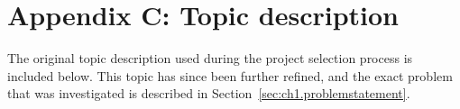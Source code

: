

\chapter*{Appendix C: Topic description}
The original topic description used during the project selection process is included below. This topic has since been further refined, and the exact problem that was investigated is described in Section~\ref{sec:ch1.problemstatement}.

%

